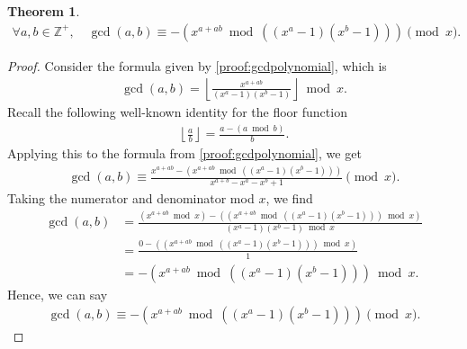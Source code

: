 \documentclass{article}
\theoremstyle{plain}
\newtheorem{theorem}{Theorem}
\theoremstyle{definition}
\newcommand{\floor}[1]{\left\lfloor #1 \right\rfloor}
\newcommand{\Z}{\mathbb{Z}}
\begin{document}
\begin{theorem} \label{proof:gcdmodmodpoly}
\begin{align*}
\forall a,b \in \Z^+, \quad
\gcd(a,b) \equiv - \left( x^{a+ab} \bmod \left((x^a-1)(x^b-1)\right) \right) \pmod{x}.
\end{align*}
\end{theorem}
\begin{proof}
Consider the formula given by \cref{proof:gcdpolynomial}, which is
\begin{align*}
    \gcd(a,b) = \floor{\frac{x^{a+ab}}{(x^a-1)(x^b-1)}} \bmod x .
\end{align*}
Recall the following well-known identity for the floor function
\begin{align*}
    \floor{\frac{a}{b}} = \frac{a - (a \bmod b)}{b} .
\end{align*}
Applying this to the formula from \cref{proof:gcdpolynomial}, we get
\begin{align*}
    \gcd(a,b)
    \equiv
    \frac{x^{a+ab}
    - \left( x^{a+ab} \bmod \left((x^a-1)(x^b-1)\right) \right)}
    {x^{a+b}-x^a-x^b+1}
    \pmod x .
\end{align*}
Taking the numerator and denominator mod $x$, we find
\begin{align*}
    \gcd(a,b) &= \frac{(x^{a+ab} \bmod x) - \left(\left( x^{a+ab} \bmod \left((x^a-1)(x^b-1)\right) \right) \bmod x \right)}
    {(x^a-1)(x^b-1) \bmod x} \\
    &=
    \frac{0 - \left(\left( x^{a+ab} \bmod \left((x^a-1)(x^b-1)\right) \right) \bmod x \right)}
    {1} \\
    &=
    - \left( x^{a+ab} \bmod \left((x^a-1)(x^b-1)\right) \right) \bmod x.
\end{align*}
Hence, we can say
\begin{align*}
\gcd(a,b) \equiv - \left( x^{a+ab} \bmod \left((x^a-1)(x^b-1)\right) \right) \pmod{x} .
\end{align*}
\end{proof}
\end{document}
